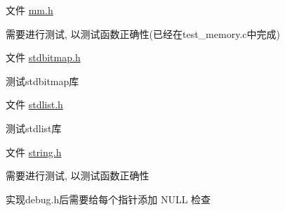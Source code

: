 
\begin{DoxyRefList}
\item[文件 \mbox{\hyperlink{mm_8h}{mm.h}} ]\label{todo__todo000001}%
%

\begin{DoxyEnumerate}
\item 需要进行测试, 以测试函数正确性(已经在test\+\_\+memory.\+c中完成) 
\end{DoxyEnumerate}
\item[文件 \mbox{\hyperlink{stdbitmap_8h}{stdbitmap.h}} ]\label{todo__todo000002}%
%

\begin{DoxyEnumerate}
\item 测试stdbitmap库 
\end{DoxyEnumerate}
\item[文件 \mbox{\hyperlink{stdlist_8h}{stdlist.h}} ]\label{todo__todo000003}%
%

\begin{DoxyEnumerate}
\item 测试stdlist库 
\end{DoxyEnumerate}
\item[文件 \mbox{\hyperlink{string_8h}{string.h}} ]\label{todo__todo000004}%
%

\begin{DoxyEnumerate}
\item 需要进行测试, 以测试函数正确性
\item 实现debug.\+h后需要给每个指针添加 N\+U\+LL 检查
\end{DoxyEnumerate}
\end{DoxyRefList}